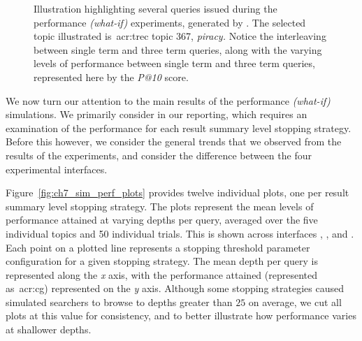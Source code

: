 \begin{figure}[t!]
    \centering
    \caption[Example queries issued]{Illustration highlighting several queries issued during the performance \emph{(what-if)} experiments, generated by . The selected topic illustrated is~\gls{acr:trec} topic 367, \emph{piracy.} Notice the interleaving between single term and three term queries, along with the varying levels of performance between single term and three term queries, represented here by the \emph{P@10} score.}
    \label{fig:ch7_example_queries}
\end{figure}

We now turn our attention to the main results of the performance \emph{(what-if)} simulations. We primarily consider  in our reporting, which requires an examination of the performance for each result summary level stopping strategy. Before this however, we consider the general trends that we observed from the results of the experiments, and consider the difference between the four experimental interfaces.

Figure~\ref{fig:ch7_sim_perf_plots} provides twelve individual plots, one per result summary level stopping strategy. The plots represent the mean levels of performance attained at varying depths per query, averaged over the five individual topics and 50 individual trials. This is shown across interfaces , ,  and . Each point on a plotted line represents a stopping threshold parameter configuration for a given stopping strategy. The mean depth per query is represented along the \emph{x} axis, with the performance attained (represented as~\gls{acr:cg}) represented on the \emph{y} axis. Although some stopping strategies caused simulated searchers to browse to depths greater than $25$ on average, we cut all plots at this value for consistency, and to better illustrate how performance varies at shallower depths.

